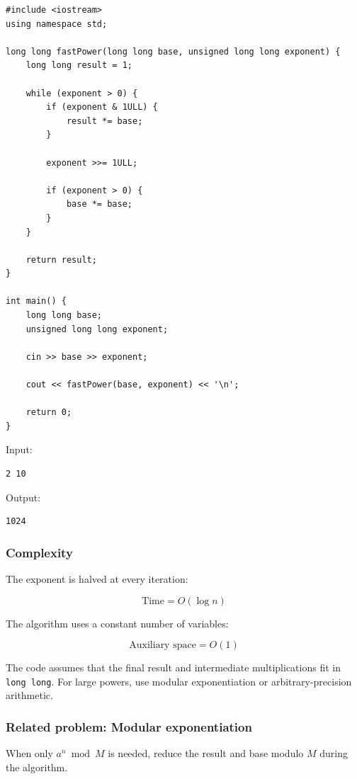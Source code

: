 \begin{lstlisting}[style=cppstyle]
#include <iostream>
using namespace std;

long long fastPower(long long base, unsigned long long exponent) {
    long long result = 1;

    while (exponent > 0) {
        if (exponent & 1ULL) {
            result *= base;
        }

        exponent >>= 1ULL;

        if (exponent > 0) {
            base *= base;
        }
    }

    return result;
}

int main() {
    long long base;
    unsigned long long exponent;

    cin >> base >> exponent;

    cout << fastPower(base, exponent) << '\n';

    return 0;
}
\end{lstlisting}

Input:

\begin{lstlisting}[style=pseudocode]
2 10
\end{lstlisting}

Output:

\begin{lstlisting}[style=pseudocode]
1024
\end{lstlisting}

\subsubsection{Complexity}

The exponent is halved at every iteration:


\[
\boxed{\text{Time}=O(\log n)}
\]


The algorithm uses a constant number of variables:


\[
\boxed{\text{Auxiliary space}=O(1)}
\]


The code assumes that the final result and intermediate multiplications fit in \texttt{long long}. For large powers, use modular exponentiation or arbitrary-precision arithmetic.

\subsubsection{Related problem: Modular exponentiation}

When only $a^n\bmod M$ is needed, reduce the result and base modulo $M$ during the algorithm.

